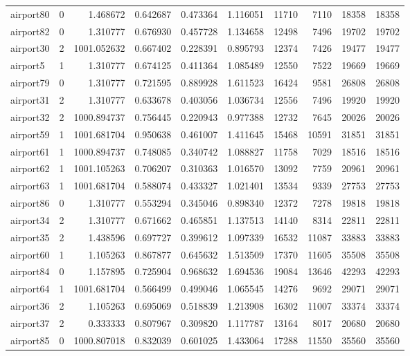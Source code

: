 \begin{longtable}{|l|r|r|r|r|r|r|r|r|r|}
airport80 & 0 & 1.468672 & 0.642687 & 0.473364 & 1.116051 & 11710 & 7110 & 18358 & 18358 \\
airport82 & 0 & 1.310777 & 0.676930 & 0.457728 & 1.134658 & 12498 & 7496 & 19702 & 19702 \\
airport30 & 2 & 1001.052632 & 0.667402 & 0.228391 & 0.895793 & 12374 & 7426 & 19477 & 19477 \\
airport5 & 1 & 1.310777 & 0.674125 & 0.411364 & 1.085489 & 12550 & 7522 & 19669 & 19669 \\
airport79 & 0 & 1.310777 & 0.721595 & 0.889928 & 1.611523 & 16424 & 9581 & 26808 & 26808 \\
airport31 & 2 & 1.310777 & 0.633678 & 0.403056 & 1.036734 & 12556 & 7496 & 19920 & 19920 \\
airport32 & 2 & 1000.894737 & 0.756445 & 0.220943 & 0.977388 & 12732 & 7645 & 20026 & 20026 \\
airport59 & 1 & 1001.681704 & 0.950638 & 0.461007 & 1.411645 & 15468 & 10591 & 31851 & 31851 \\
airport61 & 1 & 1000.894737 & 0.748085 & 0.340742 & 1.088827 & 11758 & 7029 & 18516 & 18516 \\
airport62 & 1 & 1001.105263 & 0.706207 & 0.310363 & 1.016570 & 13092 & 7759 & 20961 & 20961 \\
airport63 & 1 & 1001.681704 & 0.588074 & 0.433327 & 1.021401 & 13534 & 9339 & 27753 & 27753 \\
airport86 & 0 & 1.310777 & 0.553294 & 0.345046 & 0.898340 & 12372 & 7278 & 19818 & 19818 \\
airport34 & 2 & 1.310777 & 0.671662 & 0.465851 & 1.137513 & 14140 & 8314 & 22811 & 22811 \\
airport35 & 2 & 1.438596 & 0.697727 & 0.399612 & 1.097339 & 16532 & 11087 & 33883 & 33883 \\
airport60 & 1 & 1.105263 & 0.867877 & 0.645632 & 1.513509 & 17370 & 11605 & 35508 & 35508 \\
airport84 & 0 & 1.157895 & 0.725904 & 0.968632 & 1.694536 & 19084 & 13646 & 42293 & 42293 \\
airport64 & 1 & 1001.681704 & 0.566499 & 0.499046 & 1.065545 & 14276 & 9692 & 29071 & 29071 \\
airport36 & 2 & 1.105263 & 0.695069 & 0.518839 & 1.213908 & 16302 & 11007 & 33374 & 33374 \\
airport37 & 2 & 0.333333 & 0.807967 & 0.309820 & 1.117787 & 13164 & 8017 & 20680 & 20680 \\
airport85 & 0 & 1000.807018 & 0.832039 & 0.601025 & 1.433064 & 17288 & 11550 & 35560 & 35560 \\

\end{longtable}
